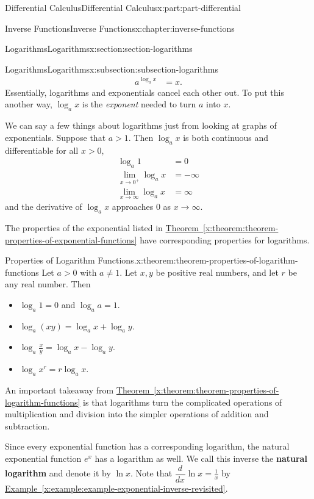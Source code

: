 \documentclass[twoside,10pt,]{book}
\newcommand{\xreffont}{\relax}
\newcommand{\terminology}[1]{\textbf{#1}}
\numberwithin{equation}{part}
\newcommand{\dv}[3][]{\dfrac{d^{#1} #2}{d #3^{#1}}}
\begin{document}
\begin{partptx}{Differential Calculus}{}{Differential Calculus}{}{}{x:part:part-differential}
\begin{chapterptx}{Inverse Functions}{}{Inverse Functions}{}{}{x:chapter:inverse-functions}
\begin{sectionptx}{Logarithms}{}{Logarithms}{}{}{x:section:section-logarithms}
\begin{subsectionptx}{Logarithms}{}{Logarithms}{}{}{x:subsection:subsection-logarithms}
\begin{align*}
a^{\log_{a}x} & = x. 
\end{align*}
Essentially, logarithms and exponentials cancel each other out. To put this another way, \(\log_{a}x\) is the \emph{exponent} needed to turn \(a\) into \(x\).%
\par
We can say a few things about logarithms just from looking at graphs of exponentials. Suppose that \(a>1\). Then \(\log_{a}x\) is both continuous and differentiable for all \(x>0\),%
\begin{align*}
\log_{a}1 & = 0 \\
\lim_{x\to0^{+}}\log_{a}x & = -\infty \\
\lim_{x\to\infty}\log_{a}x & = \infty 
\end{align*}
and the derivative of \(\log_{a}x\) approaches \(0\) as \(x\to\infty\).%
\par
The properties of the exponential listed in \hyperref[x:theorem:theorem-properties-of-exponential-functions]{Theorem~{\xreffont\ref{x:theorem:theorem-properties-of-exponential-functions}}} have corresponding properties for logarithms.%
\begin{theorem}{Properties of Logarithm Functions.}{}{x:theorem:theorem-properties-of-logarithm-functions}%
%
Let \(a>0\) with \(a\neq1\). Let \(x,y\) be positive real numbers, and let \(r\) be any real number. Then%
\begin{itemize}[label=\textbullet]
\item{}\(\log_{a}1 = 0\) and \(\log_{a}a = 1\).%
\item{}\(\log_{a}(xy) = \log_{a}x + \log_{a}y\).%
\item{}\(\log_{a}\frac{x}{y} = \log_{a}x - \log_{a}y\).%
\item{}\(\log_{a}x^{r} = r\log_{a}x\).%
\end{itemize}
%
\end{theorem}
An important takeaway from \hyperref[x:theorem:theorem-properties-of-logarithm-functions]{Theorem~{\xreffont\ref{x:theorem:theorem-properties-of-logarithm-functions}}} is that logarithms turn the complicated operations of multiplication and division into the simpler operations of addition and subtraction.%
\par
Since every exponential function has a corresponding logarithm, the natural exponential function \(e^{x}\) has a logarithm as well. We call this inverse the \terminology{natural logarithm} and denote it by \(\ln x\). Note that \(\dv{}{x}\ln x = \frac{1}{x}\) by \hyperref[x:example:example-exponential-inverse-revisited]{Example~{\xreffont\ref{x:example:example-exponential-inverse-revisited}}}.%

\end{subsectionptx}
\end{sectionptx}
\end{chapterptx}
\end{partptx}
\end{document}
